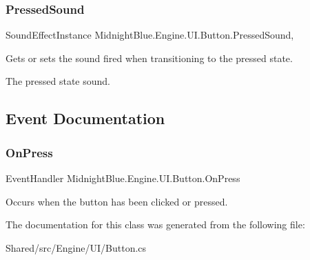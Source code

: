 \subsubsection{\texorpdfstring{Pressed\+Sound}{PressedSound}}
{\footnotesize\ttfamily Sound\+Effect\+Instance Midnight\+Blue.\+Engine.\+U\+I.\+Button.\+Pressed\+Sound\hspace{0.3cm}{\ttfamily [get]}, {\ttfamily [set]}}



Gets or sets the sound fired when transitioning to the pressed state. 

The pressed state sound.

\subsection{Event Documentation}
\hypertarget{class_midnight_blue_1_1_engine_1_1_u_i_1_1_button_af224f64410fde584da8df7703210147c}{}\label{class_midnight_blue_1_1_engine_1_1_u_i_1_1_button_af224f64410fde584da8df7703210147c} 
\subsubsection{\texorpdfstring{On\+Press}{OnPress}}
{\footnotesize\ttfamily Event\+Handler Midnight\+Blue.\+Engine.\+U\+I.\+Button.\+On\+Press}



Occurs when the button has been clicked or pressed. 



The documentation for this class was generated from the following file\+:\begin{DoxyCompactItemize}
\item 
Shared/src/\+Engine/\+U\+I/Button.\+cs\end{DoxyCompactItemize}

